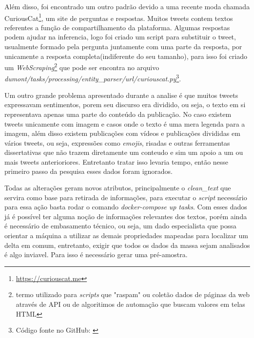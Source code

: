 Além disso, foi encontrado um outro padrão devido a uma recente moda chamada CuriousCat\footnote{\url{https://curiouscat.me}}, um site de perguntas e respostas. Muitos tweets contem textos referentes a função de compartilhamento da plataforma. Algumas respostas podem ajudar na inferencia, logo foi criado um script para substituir o tweet, usualmente formado pela pergunta juntamente com uma parte da resposta, por unicamente a resposta completa(indiferente do seu tamanho), para isso foi criado um \textit{WebScraping}\footnote{termo utilizado para \textit{scripts} que "raspam" ou coletão dados de páginas da web através de API ou de algoritimos de automação que buscam valores em telas HTML} que pode ser encontra no arquivo \textit{dumont/tasks/processing/entity\_parser/url/curiouscat.py}\footnote{Código fonte no GitHub: \url{}}.

Um outro grande problema apresentado durante a analise é que muitos tweets expressavam sentimentos, porem seu discurso era dividido, ou seja, o texto em si representava apenas uma parte do conteúdo da publicação. No caso existem tweets unicamente com imagem e casos onde o texto é uma mera legenda para a imagem, além disso existem publicações com vídeos e publicações divididas em vários tweets, ou seja, expressões como \textit{emojis}, risadas e outras ferramentas dissertativas que não trazem diretamente um conteudo e sim um apoio a um ou mais tweets anterioriores. Entretanto tratar isso levaria tempo, então nesse primeiro passo da pesquisa esses dados foram ignorados.

Todas as alterações geram novos atributos, principalmente o \textit{clean\_text} que servira como base para retirada de informações, para executar o \textit{script} necessário para essa ação basta rodar o comando \textit{docker-compose up tasks}. Com esses dados já é possível ter alguma noção de informações relevantes dos textos, porém ainda é necessário de embasamento técnico, ou seja, um dado especialista que possa orientar a máquina a utilizar as demais propriedades mapeadas para localizar um delta em comum, entretanto, exigir que todos os dados da massa sejam analisados é algo inviavel. Para isso é necessário gerar uma pré-amostra.